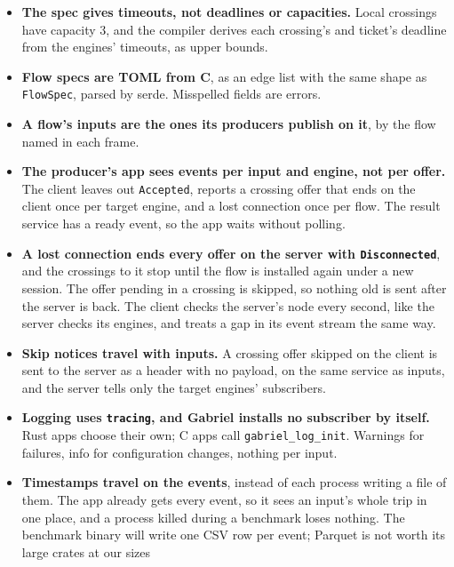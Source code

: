 \documentclass[11pt]{article}
\newcommand{\code}[1]{\texttt{#1}}
\begin{document}
\begin{itemize}[nosep]
        its own events, and a slow client fills only its own buffer. The
        stream is numbered, and drops its oldest events when full.
  \item \textbf{The spec gives timeouts, not deadlines or capacities.} Local
        crossings have capacity 3, and the compiler derives each crossing's
        and ticket's deadline from the engines' timeouts, as upper bounds.
  \item \textbf{Flow specs are TOML from C}, as an edge list with the same
        shape as \code{FlowSpec}, parsed by serde. Misspelled fields are
        errors.
  \item \textbf{A flow's inputs are the ones its producers publish on it}, by
        the flow named in each frame.
  \item \textbf{The producer's app sees events per input and engine, not per
        offer.} The client leaves out \code{Accepted}, reports a crossing
        offer that ends on the client once per target engine, and a lost
        connection once per flow. The result service has a ready event, so
        the app waits without polling.
  \item \textbf{A lost connection ends every offer on the server with
        \code{Disconnected}}, and the crossings to it stop until the flow is
        installed again under a new session. The offer pending in a crossing
        is skipped, so nothing old is sent after the server is back. The
        client checks the server's node every second, like the server checks
        its engines, and treats a gap in its event stream the same way.
  \item \textbf{Skip notices travel with inputs.} A crossing offer skipped on
        the client is sent to the server as a header with no payload, on the
        same service as inputs, and the server tells only the target engines'
        subscribers.
  \item \textbf{Logging uses \code{tracing}, and Gabriel installs no
        subscriber by itself.} Rust apps choose their own; C apps call
        \code{gabriel\_log\_init}. Warnings for failures, info for
        configuration changes, nothing per input.
  \item \textbf{Timestamps travel on the events}, instead of each process
        writing a file of them. The app already gets every event, so it sees
        an input's whole trip in one place, and a process killed during a
        benchmark loses nothing. The benchmark binary will write one CSV row
        per event; Parquet is not worth its large crates at our sizes

\end{itemize}
\end{document}
